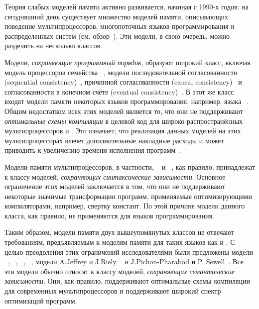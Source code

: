 Теория слабых моделей памяти активно развивается, начиная с 1990-х годов: 
на сегодняшний день существует множество моделей памяти, 
описывающих поведение мультипроцессоров, 
многопоточных языков программирования и распределенных систем 
(см. обзор~\cite{Moiseenko-al:PCS21}). 
Эти модели, в свою очередь, можно разделить на несколько классов.

Модели, \emph{сохраняющие программный порядок}, образуют широкий класс,
включая модель \TSO процессоров семейства \Intel~\autocite{Sewell-al:CACM10},
модели последовательной согласованности (sequential consistency)~\autocite{Lamport:TC79},
причинной согласованности (causal consistency)~\autocite{Lahav-Boker:PLDI2020}
и согласованности в конечном счёте (eventual consistency)~\autocite{Jagadeesan-al:ESOP2018}. 
В этот же класс входят  модели памяти некоторых языков программирования, например,
языка \OCaml~\autocite{Dolan-al:PLDI18}.
Общим недостатком всех этих моделей является то,
что они не поддерживают \emph{оптимальные схемы компиляции} 
в целевой код для широко распространённых мультипроцессоров \ARM и \POWER.
Это означает, что реализация данных моделей на этих мультипроцессорах
влечет дополнительные накладные расходы и может приводить
к увеличению времени исполнения программ~\autocite{Ou-Demsky:OOPSLA18}. 

Модели памяти мультипроцессоров,
в частности, \ARM~\autocite{Pulte-al:POPL18} и \POWER~\autocite{Sarkar-al:PLDI11}, 
как правило, принадлежат к классу моделей, \emph{сохраняющих синтаксические зависимости}. 
Основное ограничение этих моделей заключается в том, 
что они не поддерживают некоторые значимые трансформации программ, 
применяемые оптимизирующими компиляторами, например, свертку констант.
По этой причине модели данного класса, как правило,
не применяются для языков программирования.  

Таким образом, модели памяти двух вышеупомянутых классов 
не отвечают требованиям, предъявляемым к моделям памяти для таких языков как \CPP и \Java. 
С целью преодоления этих ограничений исследователями были предложены модели  
\Prm~\autocite{Kang-al:POPL17}, \Wkm~\autocite{Chakraborty-Vafeiadis:POPL19}, 
\MRD~\autocite{Paviotti-al:ESOP20}, \PwP~\autocite{Jagadeesan-al:OOPSLA2020},
модели A.Jeffrey и J.Riely ~\autocite{Jeffrey-Riely:LICS16} и J.Pichon-Pharabod и P. Sewell~\autocite{PichonPharabod-Sewell:POPL16}. Все эти модели
обычно относят к классу моделей, \emph{сохраняющих семантические зависимости}.
Они, как правило, поддерживают оптимальные схемы компиляции
для современных мультипроцессоров и поддерживают широкий спектр оптимизаций программ. 

